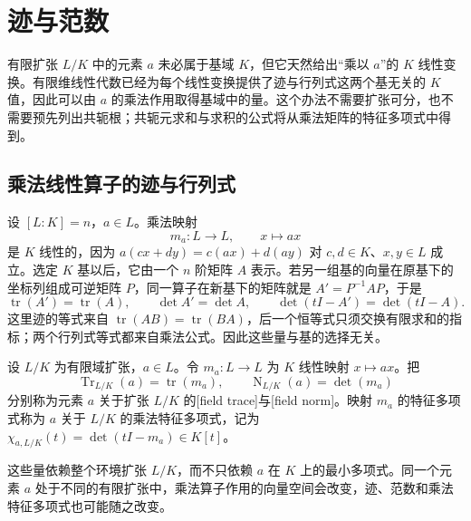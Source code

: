 
\section{迹与范数}
\label{b1:sec:1802}

%
%

有限扩张 \(L/K\) 中的元素 \(a\) 未必属于基域 \(K\)，但它天然给出“乘以 \(a\)”的 \(K\) 线性变换。有限维线性代数已经为每个线性变换提供了迹与行列式这两个基无关的 \(K\) 值，因此可以由 \(a\) 的乘法作用取得基域中的量。这个办法不需要扩张可分，也不需要预先列出共轭根；共轭元求和与求积的公式将从乘法矩阵的特征多项式中得到。

\subsection{乘法线性算子的迹与行列式}
\label{b1:subsec:1802:01}

设 \([L:K]=n\)，\(a\in L\)。乘法映射
\[
	m_a:L\longrightarrow L,\qquad x\longmapsto ax
\]
是 \(K\) 线性的，因为 \(a(cx+dy)=c(ax)+d(ay)\) 对 \(c,d\in K\)、\(x,y\in L\) 成立。选定 \(K\) 基以后，它由一个 \(n\) 阶矩阵 \(A\) 表示。若另一组基的向量在原基下的坐标列组成可逆矩阵 \(P\)，同一算子在新基下的矩阵就是 \(A'=P^{-1}AP\)，于是
\[
	\operatorname{tr}(A')=\operatorname{tr}(A),\qquad \det A'=\det A,\qquad \det(tI-A')=\det(tI-A).
\]
这里迹的等式来自 \(\operatorname{tr}(AB)=\operatorname{tr}(BA)\)，后一个恒等式只须交换有限求和的指标；两个行列式等式都来自乘法公式。因此这些量与基的选择无关。

\begin{definition}\label{b1:def:field-trace-norm}
	设 \(L/K\) 为有限域扩张，\(a\in L\)。令 \(m_a:L\rightarrow L\) 为 \(K\) 线性映射 \(x\mapsto ax\)。把
	\[
		\operatorname{Tr}_{L/K}(a)=\operatorname{tr}(m_a),\qquad \operatorname{N}_{L/K}(a)=\det(m_a)
	\]
	分别称为元素 \(a\) 关于扩张 \(L/K\) 的[field trace]与[field norm]。映射 \(m_a\) 的特征多项式称为 \(a\) 关于 \(L/K\) 的乘法特征多项式，记为 \(\chi_{a,L/K}(t)=\det(tI-m_a)\in K[t]\)。
\end{definition}
这些量依赖整个环境扩张 \(L/K\)，而不只依赖 \(a\) 在 \(K\) 上的最小多项式。同一个元素 \(a\) 处于不同的有限扩张中，乘法算子作用的向量空间会改变，迹、范数和乘法特征多项式也可能随之改变。

